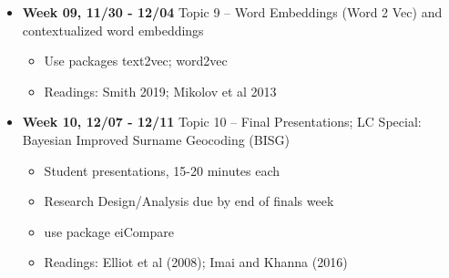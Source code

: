 \documentclass[11pt]{article}
\begin{document}
\begin{itemize}
	\item \textbf{Week 09, 11/30 - 12/04} Topic 9 -- Word Embeddings (Word 2 Vec) and contextualized word embeddings
	\begin{itemize}
	\item Use packages text2vec; word2vec
	\item Readings: Smith 2019; Mikolov et al 2013
	\end{itemize}
\end{itemize}

\begin{itemize}
	\item \textbf{Week 10, 12/07 - 12/11} Topic 10 -- Final Presentations; LC Special: Bayesian Improved Surname Geocoding (BISG)
	\begin{itemize}
	\item Student presentations, 15-20 minutes each
	\item Research Design/Analysis due by end of finals week
	\item use package eiCompare
	\item Readings: Elliot et al (2008); Imai and Khanna (2016)
	\end{itemize}
\end{itemize}
\end{document}
